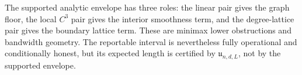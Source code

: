 The supported analytic envelope has three roles: the linear pair gives the graph floor, the local \(C^3\) pair gives the interior smoothness term, and the degree-lattice pair gives the boundary lattice term.  These are minimax lower obstructions and bandwidth geometry.  The reportable interval is nevertheless fully operational and conditionally honest, but its expected length is certified by \(\mathfrak u_{n,d,L}\), not by the supported envelope.